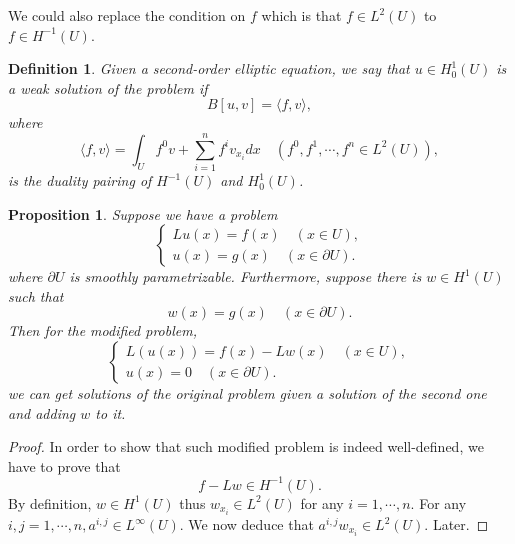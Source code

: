 \documentclass{article}
\newtheorem{proposition}{Proposition}[section]
\newtheorem{definition}{Definition}[section]
\numberwithin{equation}{section}
\begin{document}
We could also replace the condition on $f$ which is that $f\in L^2(U)$ to $f\in H^{-1}(U)$. 

\begin{definition}
Given a second-order elliptic equation, we say that $u\in H_0^1(U)$ is a weak solution of the problem if
\begin{equation*}
B[u,v]=\langle f,v\rangle,
\end{equation*}
where
\begin{equation*}
\langle f,v\rangle = \int_U f^0v+\sum_{i=1}^n f^iv_{x_i}dx\quad(f^0,f^1,\cdots,f^n\in L^2(U)),
\end{equation*}
is the duality pairing of $H^{-1}(U)$ and $H_0^1(U)$.
\end{definition}

\begin{proposition}
\par Suppose we have a problem
\begin{equation*}
\begin{cases}
Lu(x) = f(x)\quad(x\in U),\\
u(x) = g(x)\quad(x\in\partial U).
\end{cases}
\end{equation*}
where $\partial U$ is smoothly parametrizable. Furthermore, suppose there is $w\in H^1(U)$ such that 
\begin{equation*}
w(x) = g(x) \quad (x\in\partial U).
\end{equation*}
Then for the modified problem,
\begin{equation*}
\begin{cases}
L(u(x)) = f(x)-Lw(x)\quad(x\in U),\\
u(x) = 0\quad(x\in\partial U).
\end{cases}
\end{equation*}
we can get solutions of the original problem given a solution of the second one and adding $w$ to it.
\end{proposition}

\begin{proof}
In order to show that such modified problem is indeed well-defined, we have to prove that
\begin{equation*}
f-Lw\in H^{-1}(U).
\end{equation*}
By definition, $w\in H^1(U)$ thus $w_{x_i}\in L^2(U)$ for any $i=1,\cdots,n$. For any $i,j=1,\cdots,n, a^{i,j}\in L^\infty(U)$. We now deduce that $a^{i,j}w_{x_i}\in L^2(U)$. Later.
\end{proof}
\end{document}
